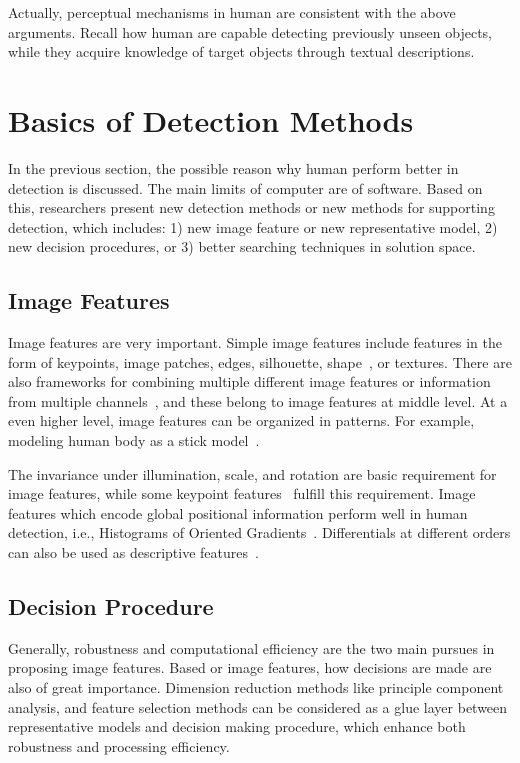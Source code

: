 Actually, perceptual mechanisms in human are consistent with the above arguments. Recall how human are capable detecting previously unseen objects, while they acquire knowledge of target objects through textual descriptions.

\section{Basics of Detection Methods}

In the previous section, the possible reason why human perform better in detection is discussed. The main limits of computer are of software. Based on this, researchers present new detection methods or new methods for supporting detection, which includes: 1) new image feature or new representative model, 2) new decision procedures, or 3) better searching techniques in solution space.
\subsection{Image Features}
Image features are very important. Simple image features include features in the form of keypoints, image patches, edges,  silhouette, shape~\cite{scontext}, or textures. There are also frameworks for combining multiple different image features or information from multiple channels~\cite{regionc,bgf,lbp,lss}, and these belong to image features at middle level. At a even higher level, image features can be  organized in patterns. For example, modeling human body as a stick model~\cite{stickb}.

The invariance under illumination, scale, and rotation are basic requirement for image features, while some keypoint features~\cite{ij2,o12,o14,o15,o2} fulfill this requirement. Image features which encode global positional information perform well in human detection, i.e., Histograms of Oriented
Gradients~\cite{ij4}. Differentials at different orders can also be used as descriptive features~\cite{ij6}.

\subsection{Decision Procedure}
Generally, robustness and computational efficiency are the two main pursues in proposing image features. Based or image features, how decisions are made are also of great importance. Dimension reduction methods like principle component analysis, and feature selection methods can be considered as a glue layer between representative models and decision making procedure, which enhance both robustness and processing efficiency.

